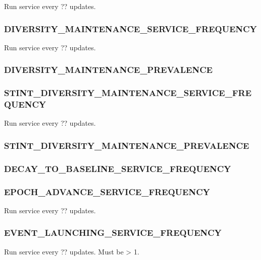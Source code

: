 Run service every ?? updates.

\subsubsection{DIVERSITY\_MAINTENANCE\_SERVICE\_FREQUENCY}


Run service every ?? updates.

\subsubsection{DIVERSITY\_MAINTENANCE\_PREVALENCE}


\subsubsection{STINT\_DIVERSITY\_MAINTENANCE\_SERVICE\_FREQUENCY}


Run service every ?? updates.

\subsubsection{STINT\_DIVERSITY\_MAINTENANCE\_PREVALENCE}


\subsubsection{DECAY\_TO\_BASELINE\_SERVICE\_FREQUENCY}


\subsubsection{EPOCH\_ADVANCE\_SERVICE\_FREQUENCY}


Run service every ?? updates.

\subsubsection{EVENT\_LAUNCHING\_SERVICE\_FREQUENCY}


Run service every ?? updates. Must be > 1.

